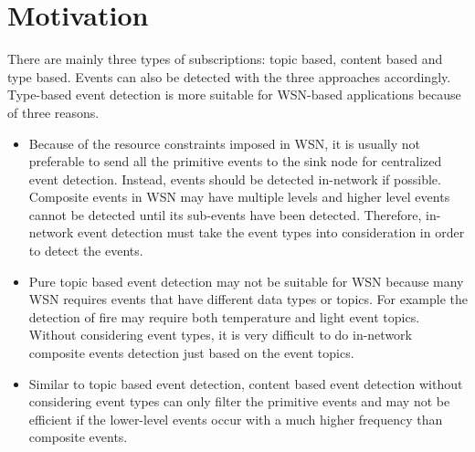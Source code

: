 \section{Motivation}
There are mainly three types of subscriptions: topic based, content based and type based. Events can also be detected with the three approaches accordingly. Type-based event detection is more suitable for WSN-based applications because of three reasons.
\begin{itemize}
\item Because of the resource constraints imposed in WSN, it is usually not preferable to send all the primitive events to the sink node for centralized event detection. Instead, events should be detected in-network if possible. Composite events in WSN may have multiple levels and higher level events cannot be detected until its sub-events have been detected. Therefore, in-network event detection must take the event types into consideration in order to detect the events. 
\item Pure topic based event detection may not be suitable for WSN because many WSN requires events that have different data types or topics. For example the detection of fire may require both temperature and light event topics. Without considering event types, it is very difficult to do in-network composite events detection just based on the event topics. 
\item Similar to topic based event detection, content based event detection without considering event types can only filter the primitive events and may not be efficient if the lower-level events occur with a much higher frequency than composite events.
\end{itemize}